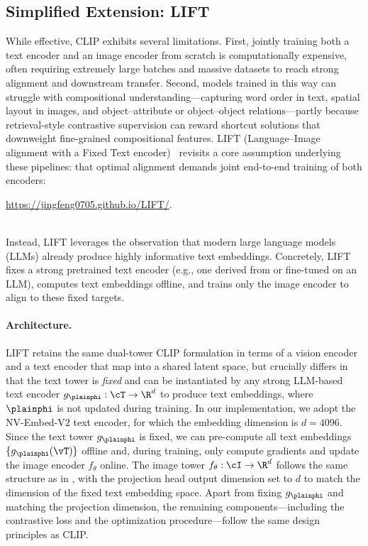 \documentclass[../../book-main.tex]{subfiles}
\begin{document}
\subsection{Simplified Extension: LIFT}\label{sub:follow-up}

While effective, CLIP exhibits several limitations. First, jointly
training both a text encoder and an image encoder from scratch is
computationally expensive, often requiring extremely large batches
and massive datasets to reach strong alignment and downstream
transfer. Second, models trained in this way can struggle with
compositional understanding—capturing word order in text, spatial
layout in images, and object–attribute or object–object
relations—partly because retrieval-style contrastive supervision can
reward shortcut solutions that downweight fine-grained compositional
features. LIFT (Language–Image alignment with a Fixed Text
encoder)~\citep{yang2025languageimagealignmentfixedtext} revisits a
core assumption underlying these pipelines: that optimal alignment
demands joint end-to-end training of both encoders:\\
\centerline{\url{https://jingfeng0705.github.io/LIFT/}.}\\
Instead, LIFT leverages the observation that modern large language
models (LLMs) already produce highly informative text embeddings.
Concretely, LIFT fixes a strong pretrained text encoder (e.g., one
derived from or fine-tuned on an LLM), computes text embeddings
offline, and trains only the image encoder to align to these fixed targets.

\paragraph{Architecture.}
LIFT retains the same dual-tower CLIP formulation in terms of a
vision encoder and a text encoder that map into a shared latent
space, but crucially differs in that the text tower is \emph{fixed}
and can be instantiated by any strong LLM-based text encoder
\(g_{\plainphi}:\cT\to\R^{d}\) to produce text embeddings, where
\(\plainphi\) is not updated during training. In our implementation,
we adopt the NV-Embed-V2 text encoder, for which the embedding
dimension is \(d=4096\). Since the text tower \(g_{\plainphi}\) is
fixed, we can pre-compute all text embeddings
\(\{g_{\plainphi}(\vT)\}\) offline and, during training, only compute
gradients and update the image encoder \(f_{\theta}\) online. The
image tower \(f_{\theta}:\cI\to\R^{d}\) follows the same structure as
in , with the projection head output
dimension set to \(d\) to match the dimension of the fixed text
embedding space. Apart from fixing \(g_{\plainphi}\) and matching the
projection dimension, the remaining components---including the
contrastive loss and the optimization procedure---follow the same
design principles as CLIP.
\end{document}
